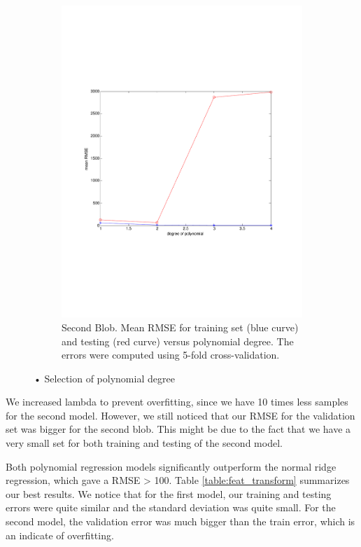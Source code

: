 \documentclass{article} %
\begin{document}
\begin{figure}[h]
\begin{subfigure}[b]{0.45\textwidth}
    \includegraphics[width=\textwidth]{figures/degree_polynomial_blob2_crop.pdf}
    \caption{Second Blob. Mean RMSE for training set (blue curve) and testing (red curve) versus polynomial degree. The errors were computed using 5-fold cross-validation.}
    \label{fig:degre_blob2}
  \end{subfigure}
  \caption{• Selection of polynomial degree}
\end{figure}

We increased lambda to prevent overfitting, since we have 10 times less samples for the second model. However, we still noticed that our RMSE for the validation set  was  bigger for the second blob. This might be due to the fact that we have a very small set for both training and testing of the second model.

Both polynomial regression models significantly outperform the normal ridge regression, which gave a RMSE > 100. Table \ref{table:feat_transform} summarizes our best results. We notice that for the first model, our training and testing errors were quite similar and the standard deviation was quite small. For the second model, the validation error was much bigger than the train error, which is an indicate of overfitting. 
\end{document}
